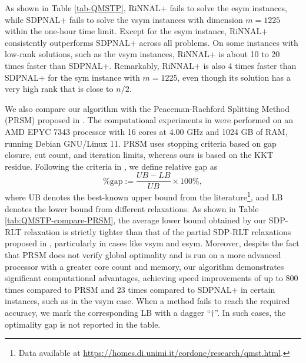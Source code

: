 \documentclass[11pt]{article}
\theoremstyle{plain}
\begin{document}
As shown in Table \ref{tab-QMSTP}, RiNNAL+ fails to solve the esym instances, while SDPNAL+ fails to solve the vsym instances with dimension $m=1225$ within the one-hour time limit. 
Except for the esym instance, RiNNAL+ consistently outperforms SDPNAL+ across all problems. 
On some instances with low-rank solutions, such as the vsym instances, RiNNAL+ is about 10 to 20 times faster than SDPNAL+. 
Remarkably, RiNNAL+ is also 4 times faster than SDPNAL+ for the sym instance with $m=1225$, even though its solution has a very high rank that is close to $n/2$. 

We also compare our algorithm with the Peaceman-Rachford Splitting Method (PRSM) proposed in \cite{de2024spanning}. The computational experiments in \cite{de2024spanning} were performed on an AMD EPYC 7343 processor with 16 cores at 4.00 GHz and 1024 GB of RAM, running Debian GNU/Linux 11. PRSM uses stopping criteria based on gap closure, cut count, and iteration limits, whereas ours is based on the KKT residue. Following the criteria in \cite{de2024spanning}, we define relative gap as
\[
\%\text{gap}:=\frac{UB-LB}{UB}\times 100\%,
\]
where UB denotes the best-known upper bound from the literature\footnote{Data available at \url{https://homes.di.unimi.it/cordone/research/qmst.html}.}, and LB denotes the lower bound from different relaxations. As shown in Table \ref{tab:QMSTP-compare-PRSM}, the average lower bound obtained by our SDP-RLT relaxation is strictly tighter than that of the partial SDP-RLT relaxations proposed in \cite{de2024spanning}, particularly in cases like vsym and esym. Moreover, despite the fact that PRSM does not verify global optimality and is run on a more advanced processor with a greater core count and memory, our algorithm demonstrates significant computational advantages, achieving speed improvements of up to 800 times compared to PRSM and 23 times compared to SDPNAL+ in certain instances, such as in the vsym case. When a method fails to reach the required accuracy, we mark the corresponding LB with a dagger ``$\dagger$''. In such cases, the optimality gap is not reported in the table.
\end{document}
